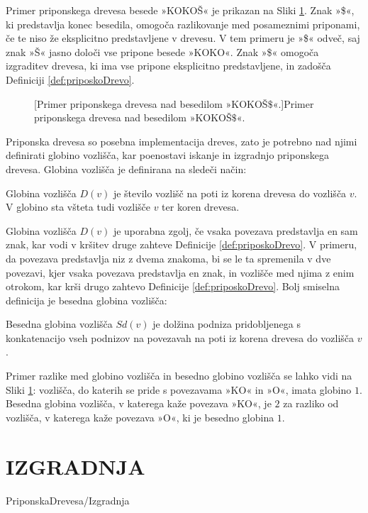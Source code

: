 Primer priponskega drevesa besede »KOKOŠ« je prikazan na Sliki \ref{fig:PriponskoDrevo}. Znak »\$«, ki predstavlja konec besedila, omogoča razlikovanje med posameznimi priponami, če te niso že eksplicitno predstavljene v drevesu. V tem primeru je »\$« odveč, saj znak »Š« jasno določi vse pripone besede »KOKO«. Znak »\$« omogoča izgraditev drevesa, ki ima vse pripone eksplicitno predstavljene, in zadošča Definiciji \ref{def:priposkoDrevo}.

\begin{figure}[tb]
    \begin{center}
        
        [Primer priponskega drevesa nad besedilom »KOKOŠ$\$$«.]{Primer priponskega drevesa nad besedilom »KOKOŠ$\$$«.} 
        \label{fig:PriponskoDrevo}
    \end{center}
\end{figure}

Priponska drevesa so posebna implementacija dreves, zato je potrebno nad njimi definirati globino vozlišča, kar poenostavi iskanje in izgradnjo priponskega drevesa. Globina vozlišča je definirana na sledeči način:

\begin{defi}
   Globina vozlišča $D(v)$ je število vozlišč na poti iz korena drevesa do vozlišča $v$. V globino sta všteta tudi vozlišče $v$ ter koren drevesa.
\end{defi}

Globina vozlišča $D(v)$ je uporabna zgolj, če vsaka povezava predstavlja en sam znak, kar vodi v kršitev druge zahteve Definicije  \ref{def:priposkoDrevo}. V primeru, da povezava predstavlja niz z dvema znakoma, bi se le ta spremenila v dve povezavi, kjer vsaka povezava predstavlja en znak, in vozlišče med njima z enim otrokom, kar krši drugo zahtevo Definicije \ref{def:priposkoDrevo}. Bolj smiselna definicija je besedna globina vozlišča:

\begin{defi}
    Besedna globina vozlišča $Sd(v)$ je dolžina podniza pridobljenega s konkatenacijo vseh podnizov na povezavah na poti iz korena drevesa do vozlišča $v$. 
\end{defi}

Primer razlike med globino vozlišča in besedno globino vozlišča se lahko vidi na Sliki \ref{fig:PriponskoDrevo}: vozlišča, do katerih se pride s povezavama »KO« in »O«, imata globino $1$. Besedna globina vozlišča, v katerega kaže povezava »KO«, je $2$ za razliko od vozlišča, v katerega kaže povezava »O«, ki je besedno globina $1$. 

\section{IZGRADNJA}\label{sec:izgradnja}
{PriponskaDrevesa/Izgradnja}